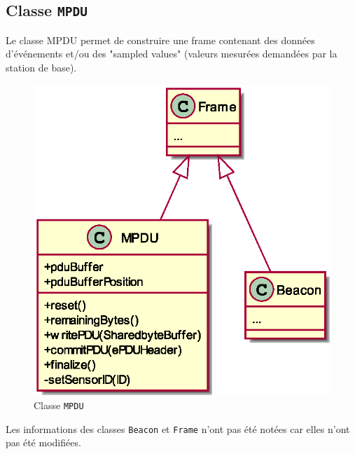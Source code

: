 \documentclass[DeseNET_Sebastien_Deriaz]{subfiles}
\begin{document}
\subsection{Classe \texttt{MPDU}}
Le classe MPDU permet de construire une frame contenant des données d'événements et/ou des "sampled values" (valeurs mesurées demandées par la station de base).
\begin{figure}[H]
\centering
\includegraphics[scale=0.5]{out/MPDU.eps}
\caption{Classe \texttt{MPDU}}
\end{figure}
Les informations des classes \verb!Beacon! et \verb!Frame! n'ont pas été notées car elles n'ont pas été modifiées.\\
\end{document}
